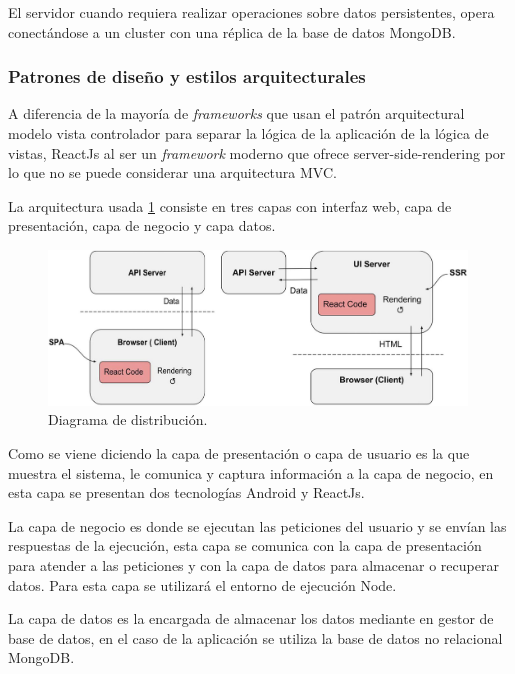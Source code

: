\documentclass{article}
\begin{document}
El servidor cuando requiera realizar operaciones sobre datos persistentes, opera conectándose a un cluster con una réplica de la base de datos MongoDB.

\pagebreak

\subsubsection*{Patrones de diseño y estilos arquitecturales}

A diferencia de la mayoría de \textit{frameworks} que usan el patrón arquitectural modelo vista controlador para separar la lógica de la aplicación de la lógica de vistas, ReactJs al ser un \textit{framework} moderno que ofrece server-side-rendering por lo que no se puede considerar una arquitectura MVC.
 
La arquitectura usada \ref{patron} consiste en tres capas con interfaz web, capa de presentación, capa de negocio y capa datos.

\begin{figure}[H]
    \centering
        \includegraphics[width=0.99\textwidth]{../images/patron.jpg}
    \caption{Diagrama de distribución.}
    \label{patron}
\end{figure}

Como se viene diciendo la capa de presentación o capa de usuario es la que muestra el sistema, le comunica y captura información a la capa de negocio, en esta capa se presentan dos tecnologías Android y ReactJs.
 
La capa de negocio es donde se ejecutan las peticiones del usuario y se envían las respuestas de la ejecución, esta capa se comunica con la capa de presentación para atender a las peticiones y con la capa de datos para almacenar o recuperar datos. Para esta capa se utilizará el entorno de ejecución Node.
 
La capa de datos es la encargada de almacenar los datos mediante en gestor de base de datos, en el caso de la aplicación se utiliza la base de datos no relacional MongoDB.
\end{document}
